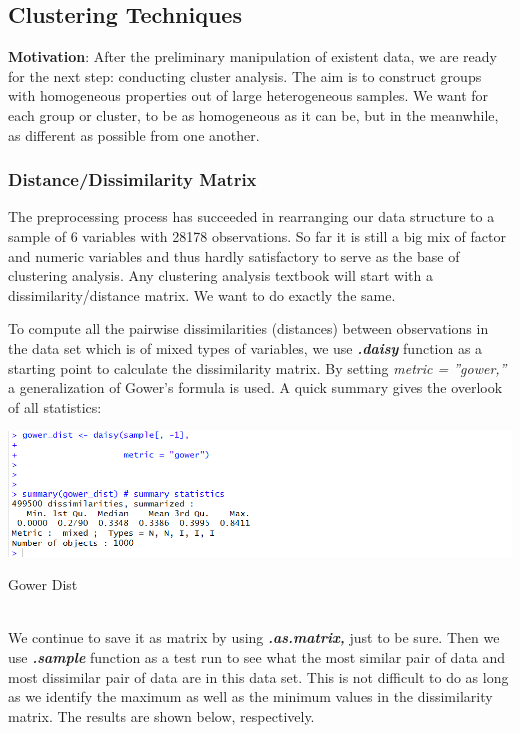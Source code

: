 \documentclass[a4paper,12pt,fleqn]{article}
\begin{document}
\subsection{Clustering Techniques}
\textbf{Motivation}: After the preliminary manipulation of existent data, we are ready for the next step: conducting cluster analysis. The aim is to construct groups with homogeneous properties out of large heterogeneous samples. We want for each group or cluster, to be as homogeneous as it can be, but in the meanwhile, as different as possible from one another.

\subsubsection{Distance/Dissimilarity Matrix}
The preprocessing process has succeeded in rearranging our data structure to a sample of 6 variables with 28178 observations. So far it is still a big mix of factor and numeric variables and thus hardly satisfactory to serve as the base of clustering analysis. Any clustering analysis textbook will start with a dissimilarity/distance matrix. We want to do exactly the same.

To compute all the pairwise dissimilarities (distances) between observations in the data set which is of mixed types of variables, we use \textbf{\textit{.daisy}} function as a starting point to calculate the dissimilarity matrix. By setting \textit{metric = ''gower,''} a generalization of Gower's formula is used. A quick summary gives the overlook of all statistics:\\
\begin{table}[h]
	\centering
	\includegraphics[width=0.95\linewidth]{"7.gower dist"}
	\caption{Gower Dist}
	\label{fig:7}
\end{table}\\
We continue to save it as matrix by using \textbf{\textit{.as.matrix,}} just to be sure. Then we use \textbf{\textit{.sample}} function as a test run to see what the most similar pair of data and most dissimilar pair of data are in this data set. This is not difficult to do as long as we identify the maximum as well as the minimum values in the dissimilarity matrix. The results are shown below, respectively.
\end{document}
